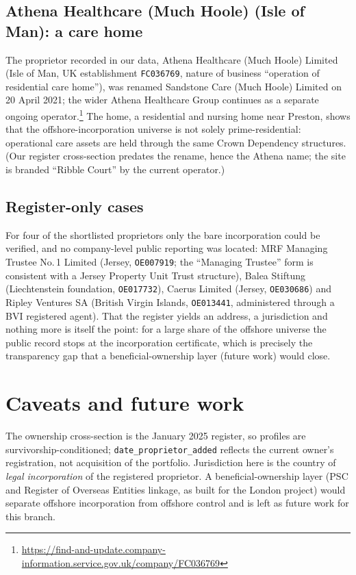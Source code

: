 \documentclass[11pt]{article}
\begin{document}
\subsection{Athena Healthcare (Much Hoole) (Isle of Man): a care home}

The proprietor recorded in our data, Athena Healthcare (Much Hoole) Limited (Isle
of Man, UK establishment \texttt{FC036769}, nature of business ``operation of
residential care home''), was renamed Sandstone Care (Much Hoole) Limited on 20
April 2021; the wider Athena Healthcare Group continues as a separate ongoing
operator.\footnote{\url{https://find-and-update.company-information.service.gov.uk/company/FC036769}}
The home, a residential and nursing home near Preston, shows that the
offshore-incorporation universe is not solely prime-residential: operational care
assets are held through the same Crown Dependency structures. (Our register
cross-section predates the rename, hence the Athena name; the site is branded
``Ribble Court'' by the current operator.)

\subsection{Register-only cases}

For four of the shortlisted proprietors only the bare incorporation could be
verified, and no company-level public reporting was located: MRF Managing Trustee
No.\,1 Limited (Jersey, \texttt{OE007919}; the ``Managing Trustee'' form is
consistent with a Jersey Property Unit Trust structure), Balea Stiftung
(Liechtenstein foundation, \texttt{OE017732}), Caerus Limited (Jersey,
\texttt{OE030686}) and Ripley Ventures SA (British Virgin Islands,
\texttt{OE013441}, administered through a BVI registered agent). That the register
yields an address, a jurisdiction and nothing more is itself the point: for a
large share of the offshore universe the public record stops at the incorporation
certificate, which is precisely the transparency gap that a beneficial-ownership
layer (future work) would close.

\section{Caveats and future work}

The ownership cross-section is the January 2025 register, so profiles are
survivorship-conditioned; \texttt{date\_proprietor\_added} reflects the current
owner's registration, not acquisition of the portfolio. Jurisdiction here is
the country of \emph{legal incorporation} of the registered proprietor. A
beneficial-ownership layer (PSC and Register of Overseas Entities linkage, as
built for the London project) would separate offshore incorporation from
offshore control and is left as future work for this branch.
\end{document}
